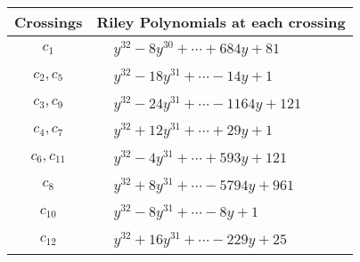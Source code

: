 \documentclass[1p]{elsarticle_modified}
\theoremstyle{definition}
\begin{document}
\begin{tabular}{m{50pt}|m{274pt}}
Crossings & \hspace{64pt}Riley Polynomials at each crossing \\
\hline $$\begin{aligned}c_{1}\end{aligned}$$&$\begin{aligned}
&y^{32}-8 y^{30}+\cdots+684 y+81
\end{aligned}$\\
\hline $$\begin{aligned}c_{2},c_{5}\end{aligned}$$&$\begin{aligned}
&y^{32}-18 y^{31}+\cdots-14 y+1
\end{aligned}$\\
\hline $$\begin{aligned}c_{3},c_{9}\end{aligned}$$&$\begin{aligned}
&y^{32}-24 y^{31}+\cdots-1164 y+121
\end{aligned}$\\
\hline $$\begin{aligned}c_{4},c_{7}\end{aligned}$$&$\begin{aligned}
&y^{32}+12 y^{31}+\cdots+29 y+1
\end{aligned}$\\
\hline $$\begin{aligned}c_{6},c_{11}\end{aligned}$$&$\begin{aligned}
&y^{32}-4 y^{31}+\cdots+593 y+121
\end{aligned}$\\
\hline $$\begin{aligned}c_{8}\end{aligned}$$&$\begin{aligned}
&y^{32}+8 y^{31}+\cdots-5794 y+961
\end{aligned}$\\
\hline $$\begin{aligned}c_{10}\end{aligned}$$&$\begin{aligned}
&y^{32}-8 y^{31}+\cdots-8 y+1
\end{aligned}$\\
\hline $$\begin{aligned}c_{12}\end{aligned}$$&$\begin{aligned}
&y^{32}+16 y^{31}+\cdots-229 y+25
\end{aligned}$\\
\hline
\end{tabular}\\~\\
\end{document}
